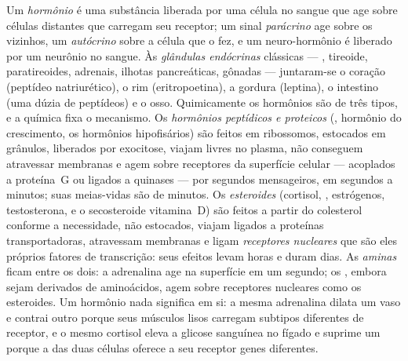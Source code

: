 \begin{definition}[Hormônio]\label{def:b3:endocrinology:hormone}
Um \emph{hormônio} é uma substância liberada por uma célula no sangue
que age sobre células distantes que carregam seu receptor; um sinal
\emph{parácrino} age sobre os vizinhos, um \emph{autócrino} sobre a
célula que o fez, e um neuro-hormônio é liberado por um neurônio no
sangue. Às \emph{glândulas endócrinas} clássicas --- , tireoide,
paratireoides, adrenais, ilhotas pancreáticas, gônadas --- juntaram-se o
coração (peptídeo natriurético), o rim (eritropoetina), a gordura
(leptina), o intestino (uma dúzia de peptídeos) e o osso. Quimicamente
os hormônios são de três tipos, e a química fixa o mecanismo. Os
\emph{hormônios peptídicos e proteicos} (, hormônio do
crescimento, os hormônios hipofisários) são feitos em ribossomos,
estocados em grânulos, liberados por exocitose, viajam livres no plasma,
não conseguem atravessar membranas e agem sobre receptores da superfície
celular --- acoplados a proteína~G ou ligados a quinases --- por
segundos mensageiros, em segundos a minutos; suas meias-vidas são de
minutos. Os \emph{esteroides} (cortisol, , estrógenos,
testosterona, e o secosteroide vitamina~D) são feitos a partir do
colesterol conforme a necessidade, não estocados, viajam ligados a
proteínas transportadoras, atravessam membranas e ligam \emph{receptores
nucleares} que são eles próprios fatores de transcrição: seus efeitos
levam horas e duram dias. As \emph{aminas} ficam entre os dois: a
adrenalina age na superfície em um segundo; os ,
embora sejam derivados de aminoácidos, agem sobre receptores nucleares
como os esteroides. Um hormônio nada significa em si: a mesma adrenalina
dilata um vaso e contrai outro porque seus músculos lisos carregam
subtipos diferentes de receptor, e o mesmo cortisol eleva a glicose
sanguínea no fígado e suprime um  porque a  das duas
células oferece a seu receptor genes diferentes.
\end{definition}


